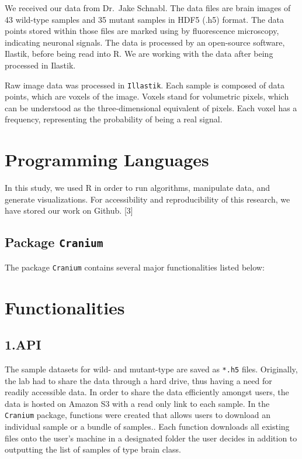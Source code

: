 \documentclass[10pt,letterpaper]{article}
\begin{document}
We received our data from Dr.~Jake Schnabl. The data files are brain
images of 43 wild-type samples and 35 mutant samples in HDF5 (.h5)
format. The data points stored within those files are marked using by
fluorescence microscopy, indicating neuronal signals. The data is
processed by an open-source software, Ilastik, before being read into R.
We are working with the data after being processed in Ilastik.

Raw image data was processed in \texttt{Illastik}. Each sample is
composed of data points, which are voxels of the image. Voxels stand for
volumetric pixels, which can be understood as the three-dimensional
equivalent of pixels. Each voxel has a frequency, representing the
probability of being a real signal.

\hypertarget{programming-languages}{%
\section{Programming Languages}\label{programming-languages}}

In this study, we used R in order to run algorithms, manipulate data,
and generate visualizations. For accessibility and reproducibility of
this research, we have stored our work on Github. {[}3{]}

\hypertarget{package-cranium}{%
\subsection{\texorpdfstring{Package
\texttt{Cranium}}{Package Cranium}}\label{package-cranium}}

The package \texttt{Cranium} contains several major functionalities
listed below:

\hypertarget{functionalities}{%
\section{Functionalities}\label{functionalities}}

\hypertarget{api}{%
\subsection{1.API}\label{api}}

The sample datasets for wild- and mutant-type are saved as \texttt{*.h5}
files. Originally, the lab had to share the data through a hard drive,
thus having a need for readily accessible data. In order to share the
data efficiently amongst users, the data is hosted on Amazon S3 with a
read only link to each sample. In the \texttt{Cranium} package,
functions were created that allows users to download an individual
sample or a bundle of samples.. Each function downloads all existing
files onto the user's machine in a designated folder the user decides in
addition to outputting the list of samples of type brain class.
\end{document}

